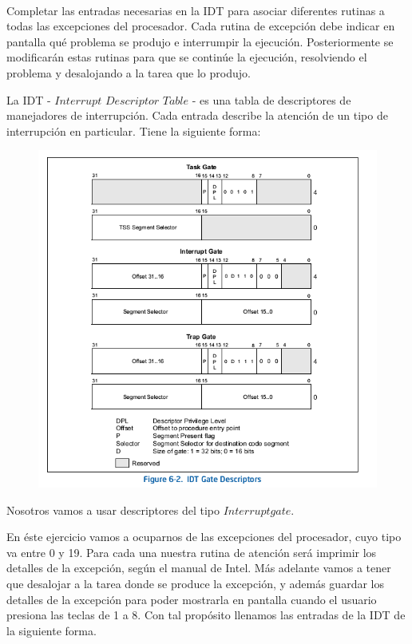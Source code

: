 \paragraph{}\label{subsubsec:ej2-a}
Completar las entradas necesarias en la IDT para asociar diferentes rutinas a
todas las excepciones del procesador. Cada rutina de excepción debe indicar en
pantalla qué problema se produjo e interrumpir la ejecución. Posteriormente se
modificarán estas rutinas para que se continúe la ejecución, resolviendo el
problema y desalojando a la tarea que lo produjo.
\hruler

La IDT - $Interrupt$ $Descriptor$ $Table$ - es una tabla de descriptores de manejadores de interrupción. Cada entrada describe la atención de
un tipo de interrupción en particular. Tiene la siguiente forma:

\begin{figure}[H]
\begin{center}
\includegraphics[]{imagenes/idt_entry.png}
\end{center}
\end{figure}

Nosotros vamos a usar descriptores del tipo $Interrupt gate$.

En éste ejercicio vamos a ocuparnos de las excepciones del procesador, cuyo tipo va entre 0 y 19.
Para cada una nuestra rutina de atención será imprimir los detalles de la excepción, según el manual de Intel. Más adelante vamos a tener que
desalojar a la tarea donde se produce la excepción, y además guardar los detalles de la excepción para poder mostrarla en pantalla cuando
el usuario presiona las teclas de 1 a 8.
Con tal propósito llenamos las entradas de la IDT de la siguiente forma.

